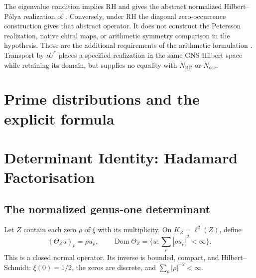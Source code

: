 \begin{remark}
\label{v4-arith:w5-b:rem:equals-HPAr}
The eigenvalue condition implies RH and gives the abstract normalized
Hilbert--P\'olya realization of
. Conversely, under RH the
diagonal zero-occurrence construction gives that abstract operator.
It does not construct the Petersson realization, native chiral maps,
or arithmetic symmetry comparison in the hypothesis. Those are the
additional requirements of the arithmetic formulation
. Transport by $\iota U^*$ places a
specified realization in the same GNS Hilbert space while retaining
its domain, but supplies no equality with $N_{\mathrm{BC}}$ or
$N_{\mathrm{occ}}$.
\end{remark}

\section{Prime distributions and the explicit formula}


\section{Determinant Identity: Hadamard Factorisation}
\label{v4-arith:w5-b:determinant}

\subsection{The normalized genus-one determinant}
\label{v4-arith:sc:determinant}

Let $Z$ contain each zero $\rho$ of $\xi$ with its multiplicity.
On $K_Z=\ell^2(Z)$, define
\[
 (\Theta_Zu)_\rho=\rho u_\rho,\qquad
 \operatorname{Dom}\Theta_Z=\{u:\sum_\rho|\rho u_\rho|^2<\infty\}.
\]
This is a closed normal operator. Its inverse is bounded, compact,
and Hilbert--Schmidt: $\xi(0)=1/2$, the zeros are discrete, and
$\sum_\rho|\rho|^{-2}<\infty$.

